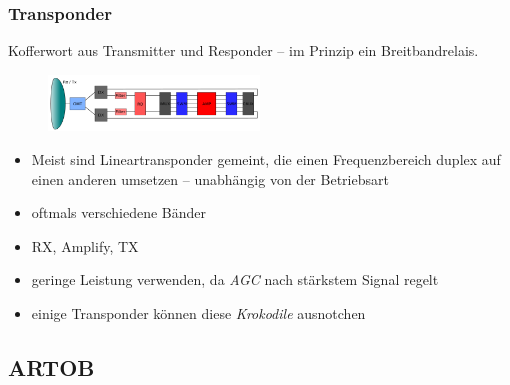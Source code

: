 \begin{frame}
  \frametitle{Transponder}

  Kofferwort aus Transmitter und Responder -- im Prinzip ein Breitbandrelais.

  \begin{center}
    \begin{figure}
      \includegraphics[width=0.5\textwidth,height=.3\textheight,keepaspectratio]{bv11/Transponder.png}
    \end{figure}
  \end{center}

  \begin{itemize}
    \item Meist sind Lineartransponder gemeint, die einen Frequenzbereich
      duplex auf einen anderen umsetzen -- unabhängig von der Betriebsart
    \item oftmals verschiedene Bänder
    \item RX, Amplify, TX
    \item geringe Leistung verwenden, da \emph{AGC} nach stärkstem Signal regelt
    \item einige Transponder können diese \emph{Krokodile} ausnotchen
  \end{itemize}

\end{frame}

\subsection{ARTOB}

